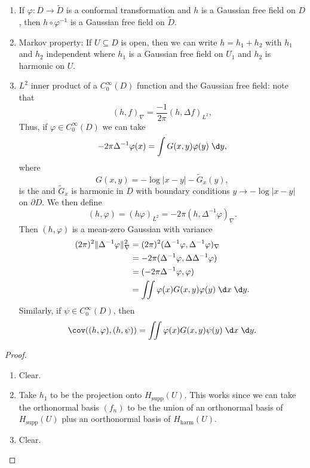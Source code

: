 \documentclass[a4paper]{article}
\begin{document}
\begin{prop}\leavevmode
  \begin{enumerate}
    \item If $\varphi: D \to \tilde{D}$ is a conformal transformation and $h$ is a Gaussian free field on $D$, then $h \circ \varphi^{-1}$ is a Gaussian free field on $\tilde{D}$.
    \item Markov property: If $U \subseteq D$ is open, then we can write $h = h_1 + h_2$ with $h_1$ and $h_2$ independent where $h_1$ is a Gaussian free field on $U_1$ and $h_2$ is harmonic on $U$.
    \item $L^2$ inner product of a $C_0^\infty(D)$ function and the Gaussian free field: note that
      \[
        (h, f)_\nabla = \frac{-1}{2\pi} (h, \Delta f)_{L^2},
      \]
      Thus, if $\varphi \in C_0^\infty(D)$ we can take
      \[
        -2\pi \Delta^{-1}\varphi(x) = \int G(x, y) \varphi(y) \;\d y,
      \]
      where %
      \[
        G(x, y) = - \log |x - y| - \tilde{G}_x(y),
      \]
      is the  and $\tilde{G}_x$ is harmonic in $D$ with boundary conditions $y \to - \log |x - y|$ on $\partial D$. We then define
      \[
        (h, \varphi) = (h \varphi)_{L^2} = - 2\pi (h, \Delta^{-1}\varphi)_\nabla.
      \]
      Then $(h, \varphi)$ is a mean-zero Gaussian with variance
      \begin{align*}
        (2\pi)^2 \|\Delta^{-1} \varphi\|_{\nabla}^2 &= (2\pi)^2 (\Delta^{-1}\varphi, \Delta^{-1}\varphi)_{\nabla} \\
        &= - 2\pi (\Delta^{-1} \varphi, \Delta \Delta^{-1}\varphi)\\
        &= (-2\pi \Delta^{-1} \varphi, \varphi)\\
        &= \iint \varphi(x) G(x, y) \varphi(y)\;\d x\;\d y.
      \end{align*}
      Similarly, if $\psi \in C_0^\infty(D)$, then
      \[
        \cov( (h, \varphi), (h, \psi)) = \iint \varphi(x) G(x, y) \psi(y)\;\d x\;\d y.
      \]
  \end{enumerate}
\end{prop}

\begin{proof}\leavevmode
  \begin{enumerate}
    \item Clear.
    \item Take $h_1$ to be the projection onto $H_{\mathrm{supp}}(U)$. This works since we can take the orthonormal basis $(f_n)$ to be the union of an orthonormal basis of $H_{\mathrm{supp}}(U)$ plus an oorthonormal basis of $H_{\mathrm{harm}}(U)$.
    \item Clear.\qedhere
  \end{enumerate}
\end{proof}
\end{document}

